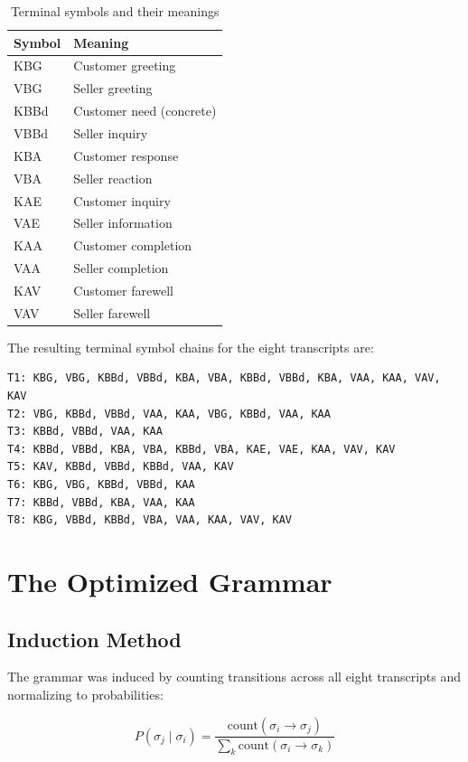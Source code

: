 \documentclass[12pt,a4paper]{article}
\begin{document}
\begin{table}[H]
\centering
\caption{Terminal symbols and their meanings}
\label{tab:terminals}
\begin{tabular}{@{} l l @{}}
\toprule
\textbf{Symbol} & \textbf{Meaning} \\
\midrule
KBG & Customer greeting \\
VBG & Seller greeting \\
KBBd & Customer need (concrete) \\
VBBd & Seller inquiry \\
KBA & Customer response \\
VBA & Seller reaction \\
KAE & Customer inquiry \\
VAE & Seller information \\
KAA & Customer completion \\
VAA & Seller completion \\
KAV & Customer farewell \\
VAV & Seller farewell \\
\bottomrule
\end{tabular}
\end{table}

The resulting terminal symbol chains for the eight transcripts are:

\begin{verbatim}
T1: KBG, VBG, KBBd, VBBd, KBA, VBA, KBBd, VBBd, KBA, VAA, KAA, VAV, KAV
T2: VBG, KBBd, VBBd, VAA, KAA, VBG, KBBd, VAA, KAA
T3: KBBd, VBBd, VAA, KAA
T4: KBBd, VBBd, KBA, VBA, KBBd, VBA, KAE, VAE, KAA, VAV, KAV
T5: KAV, KBBd, VBBd, KBBd, VAA, KAV
T6: KBG, VBG, KBBd, VBBd, KAA
T7: KBBd, VBBd, KBA, VAA, KAA
T8: KBG, VBBd, KBBd, VBA, VAA, KAA, VAV, KAV
\end{verbatim}

\section{The Optimized Grammar}

\subsection{Induction Method}

The grammar was induced by counting transitions across all eight transcripts
and normalizing to probabilities:

\[
P(\sigma_j \mid \sigma_i) = \frac{\text{count}(\sigma_i \to \sigma_j)}{\sum_k \text{count}(\sigma_i \to \sigma_k)}
\]
\end{document}
